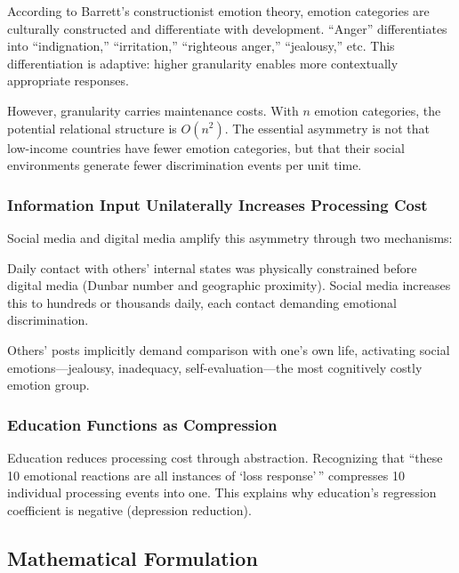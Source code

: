 \documentclass[a4paper,11pt,titlepage]{article}
\begin{document}
According to Barrett's constructionist emotion theory, emotion categories are culturally constructed and differentiate with development. ``Anger'' differentiates into ``indignation,'' ``irritation,'' ``righteous anger,'' ``jealousy,'' etc. This differentiation is adaptive: higher granularity enables more contextually appropriate responses.

However, granularity carries maintenance costs. With $n$ emotion categories, the potential relational structure is $O(n^2)$. The essential asymmetry is not that low-income countries have fewer emotion categories, but that their social environments generate fewer discrimination events per unit time.

\subsubsection{Information Input Unilaterally Increases Processing Cost}

Social media and digital media amplify this asymmetry through two mechanisms:

\begin{description}[leftmargin=2em]
\item[(a) Exposure volume] Daily contact with others' internal states was physically constrained before digital media (Dunbar number and geographic proximity). Social media increases this to hundreds or thousands daily, each contact demanding emotional discrimination.
\item[(b) Self-referential comparison] Others' posts implicitly demand comparison with one's own life, activating social emotions---jealousy, inadequacy, self-evaluation---the most cognitively costly emotion group.
\end{description}

\subsubsection{Education Functions as Compression}

Education reduces processing cost through abstraction. Recognizing that ``these 10 emotional reactions are all instances of `loss response'\,'' compresses 10 individual processing events into one. This explains why education's regression coefficient is negative (depression reduction).


\subsection{Mathematical Formulation}\label{sec:math}
\end{document}
